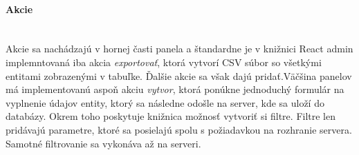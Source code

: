 \paragraph{Akcie}\leavevmode\\
Akcie sa nachádzajú v hornej časti panela a štandardne je v knižnici React admin implemntovaná iba
akcia \textit{exportovať}, ktorá vytvorí CSV súbor so všetkými entitami zobrazenými v tabuľke.
Ďalšie akcie sa však dajú pridať.Väčšina panelov má implementovanú aspoň akciu \textit{vytvor},
ktorá ponúkne jednoduchý formulár na vyplnenie údajov entity, ktorý sa následne odošle na server,
kde sa uloží do databázy. Okrem toho poskytuje knižnica možnosť vytvoriť si filtre. Filtre len
pridávajú parametre, ktoré sa posielajú spolu s požiadavkou na rozhranie servera. Samotné
filtrovanie sa vykonáva až na serveri. 

